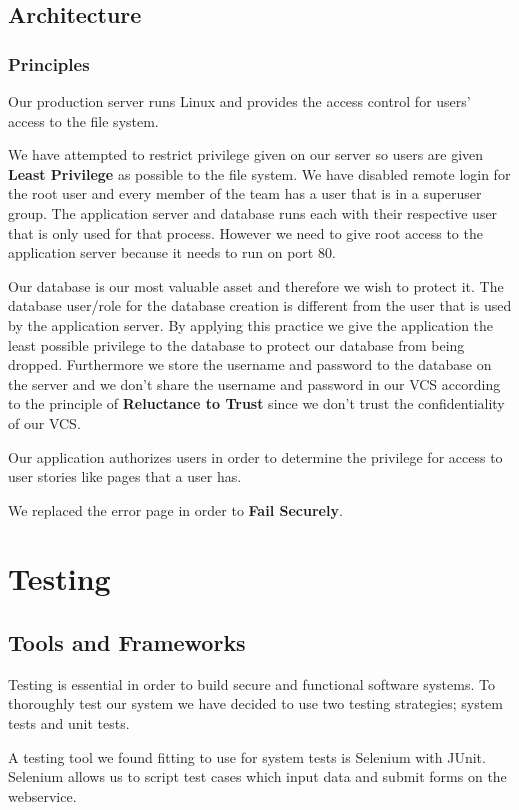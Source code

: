 \documentclass[a4paper]{article}
\begin{document}
\subsection{Architecture}

\subsubsection{Principles}

Our production server runs Linux and provides the access control for users' access to the file system.

We have attempted to restrict privilege given on our server so users are given 
\textbf{Least Privilege} as possible to the file system. We have disabled remote login for the root user and every member of the team has a user that is in a superuser group. The application server and database runs each with their respective user that is only used for that process. However we need to give root access to the application server because it needs to run on port 80.


Our database is our most valuable asset and therefore we wish to protect it. The database user/role for the database creation is different from the user that is used by the application server. By applying this practice we give the application the least possible privilege to the database to protect our database from being dropped. Furthermore we store the username and password to the database on the server and we don't share the username and password in our VCS according to the principle of \textbf{Reluctance to Trust} since we don't trust the confidentiality of our VCS.

Our application authorizes users in order to determine the privilege for access to user stories like pages that a user has.

We replaced the error page in order to \textbf{Fail Securely}.


\section{Testing}
\subsection{Tools and Frameworks}
Testing is essential in order to build secure and functional software systems. To thoroughly test our system we have decided to use two testing strategies; system tests and unit tests.

A testing tool we found fitting to use for system tests is Selenium with JUnit. Selenium allows us to script test cases which input data and submit forms on the webservice.
\end{document}
